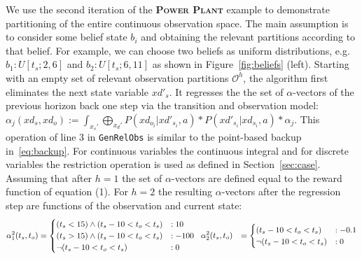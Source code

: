 \documentclass{article} %
\begin{document}
We use the second iteration of the \textsc{\bf Power Plant} example to
demonstrate partitioning of the entire continuous observation
space. The main assumption is to consider some belief state $b_i$ and
obtaining the relevant partitions according to that belief. For
example, we can choose two beliefs as uniform distributions,
e.g. $b_1: U[t_s;2,6]$ and $b_2: U[t_s;6,11]$ as shown in
Figure~\ref{fig:beliefs} (left).  Starting with an empty set of
relevant observation partitions $\mathcal{O}^h$, the algorithm first
eliminates the next state variable $xd'_s$. It regresses the
the set of
$\alpha$-vectors of the previous horizon back one step via
the transition and observation model: $\alpha_j(xd_s,xd_o) :=
\int_{x_s'} \bigoplus_{x_d'} P(xd_{o_i}|xd'_{s_i},a) * P(xd'_{s_i}| xd_{s_i},a)* \alpha_j
$.  This operation of line 3 in \texttt{GenRelObs} is similar to 
the point-based backup in~\eqref{eq:backup}. For
continuous variables the continuous integral and for discrete
variables the restriction operation is used as defined in
Section~\ref{sec:case}.  
Assuming that after $h=1$ the set of $\alpha$-vectors are
defined equal to the reward function of equation (1).
For $h=2$ the resulting $\alpha$-vectors after the regression step are functions of the observation and current state: 
{\footnotesize
\vspace{-2mm}
\begin{align}
\alpha_1^2(t_s,t_o) &= 
\begin{cases}
 (t_s<15)\wedge (t_s - 10 < t_o<t_s) &: 10 \\
(t_s>15)\wedge (t_s - 10 < t_o<t_s) &: -100  \\
\neg(t_s - 10 < t_o<t_s) &: 0
\end{cases}
\hspace{2mm} 
\alpha_2^2(t_s,t_o) &= \begin{cases}
(t_s - 10 < t_o<t_s) &: -0.1 \\
\neg(t_s - 10 < t_o<t_s) &: 0
\end{cases}
\nonumber
\end{align}
} 
\end{document}
